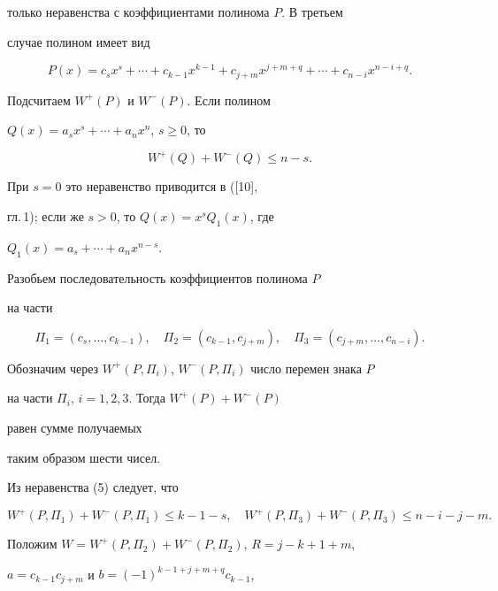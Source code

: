\begin{pf}
только неравенства с коэффициентами полинома $P$. В третьем 


случае полином имеет вид 


$$ 


P(x)=c_s x^s+\dotsb+c_{k-1} x^{k-1}+c_{j+m}x^{j+m+q} 


+\dotsb+c_{n-i}x^{n-i+q}. 


$$ 


 


Подсчитаем $W^+(P)$ и $W^-(P)$. Если полином 


$Q(x)=a_s x^s+\dotsb+a_n x^n$, $s\ge 0$, то 


\begin{equation} 


W^+(Q)+W^-(Q)\le n-s. 


\end{equation} 


При $s=0$ это неравенство приводится в ([10], 


гл.\,1); если же $s>0$, то $Q(x)=x^sQ_1(x)$, где 


$Q_1(x)=a_s+\dotsb+a_n x^{n-s}$. 


Разобьем последовательность коэффициентов полинома $P$ 


на части


$$ 


\Pi_1=(c_s,\dotsc,c_{k-1}),\quad 


\Pi_2=(c_{k-1},c_{j+m}),\quad 


\Pi_3=(c_{j+m},\dotsc,c_{n-i}). 


$$ 


Обозначим через $W^+(P,\Pi_i)$, $W^-(P,\Pi_i)$ число перемен знака $P$ 


на части $\Pi_i$, $i=1,2,3$. Тогда $W^+(P)+W^-(P)$ 


равен сумме получаемых 


таким образом шести чисел. 


 


Из неравенства (5) следует, что 


$$ 


W^+(P,\Pi_1)+W^-(P,\Pi_1)\le k-1-s,\quad 


W^+(P,\Pi_3)+W^-(P,\Pi_3)\le n-i-j-m. 


$$ 


Положим $W=W^+(P,\Pi_2)+W^-(P,\Pi_2)$, $R=j-k+1+m$, 


$a=c_{k-1}c_{j+m}$ и $b=(-1)^{k-1+j+m+q}c_{k-1}$, 



\end{pf}
